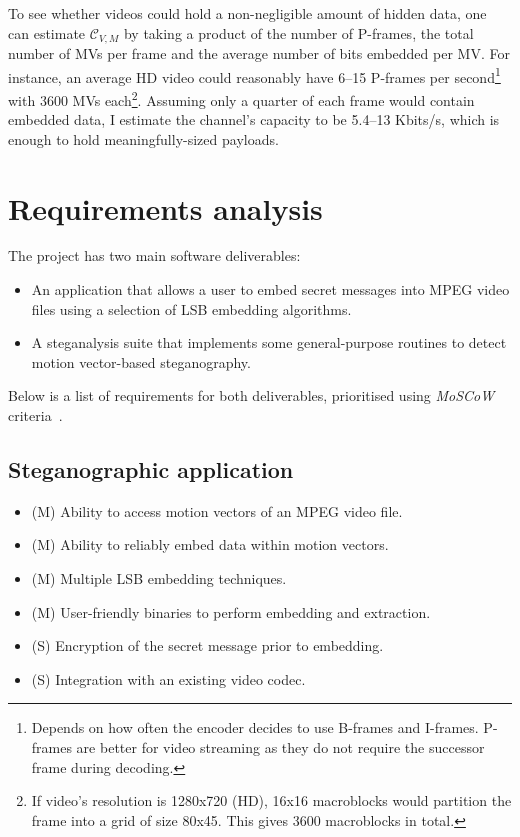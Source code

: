 \documentclass[12pt,british,twoside,notitlepage,usenames,dvipsnames,hypens,final]{report}
\numberwithin{equation}{section}
\numberwithin{figure}{section}
\begin{document}
To see whether videos could hold a non-negligible amount of hidden data, one can estimate $\mathcal{C}_{V, M}$ by taking a product of the number of P-frames, the total number of MVs per frame and the average number of bits embedded per MV. For instance, an average HD video could reasonably have 6--15 P-frames per second\footnote{Depends on how often the encoder decides to use B-frames and I-frames. P-frames are better for video streaming as they do not require the successor frame during decoding.} with 3600 MVs each\footnote{If video's resolution is 1280x720 (HD), 16x16 macroblocks would partition the frame into a grid of size 80x45. This gives 3600 macroblocks in total.}. Assuming only a quarter of each frame would contain embedded data, I estimate the channel's capacity to be 5.4--13 Kbits/s, which is enough to hold meaningfully-sized payloads. 

\section{Requirements analysis}

The project has two main software deliverables:
\begin{itemize}
\item  An application that allows a user to embed secret messages into MPEG video files using a selection of LSB embedding algorithms.
\item A steganalysis suite that implements some general-purpose routines to detect motion vector-based steganography.
\end{itemize}

Below is a list of requirements for both deliverables, prioritised using \emph{MoSCoW} criteria~\cite{softid-notes}.

\subsection{Steganographic application}
\label{req-steg-app}
\begin{itemize}
\item (M) Ability to access motion vectors of an MPEG video file.
\item (M) Ability to reliably embed data within motion vectors.
\item (M) Multiple LSB embedding techniques.
\item (M) User-friendly binaries to perform embedding and extraction.
\item (S) Encryption of the secret message prior to embedding.
\item (S) Integration with an existing video codec.
\end{itemize}
\end{document}
